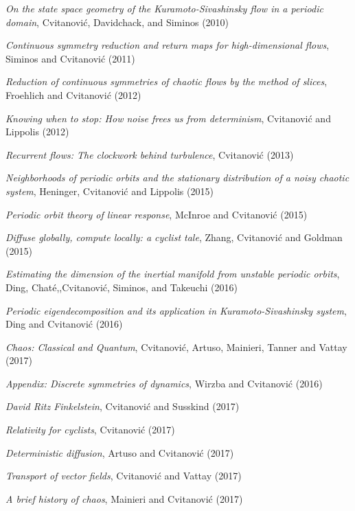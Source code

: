 {{
{\em On the state space geometry of the {Kuramoto-Sivashinsky} flow in a periodic domain},
{Cvitanovi{\'c}, Davidchack, and Siminos}
{(2010)}

{\em Continuous symmetry reduction and return maps for high-dimensional flows},
{Siminos and Cvitanovi{\'c}}
{(2011)}

{\em Reduction of continuous symmetries of chaotic flows by the method of
slices},
{Froehlich and Cvitanovi{\'c}}
{(2012)}

{\em Knowing when to stop: {How} noise frees us from determinism},
{Cvitanovi{\'c} and Lippolis}
{(2012)}

{\em Recurrent flows: {The} clockwork behind turbulence},
{Cvitanovi{\'c}}
{(2013)}

{\em Neighborhoods of periodic orbits and the stationary distribution of
a noisy chaotic system},
{Heninger, Cvitanovi{\'c} and Lippolis}
{(2015)}

{\em Periodic orbit theory of linear response},
{McInroe and Cvitanovi{\'c}}
{(2015)}

{\em Diffuse globally, compute locally: a cyclist tale},
{Zhang, Cvitanovi{\'c} and Goldman}
{(2015)}

{\em Estimating the dimension of the inertial manifold from unstable
periodic orbits},
{Ding, Chat\'e,,Cvitanovi\'c, Siminos, and Takeuchi}
{(2016)}

{\em Periodic eigendecomposition and its application in
{Kuramoto-Sivashinsky} system},
{Ding and Cvitanovi{\'c}}
{(2016)}

 {\em Chaos: {Classical and Quantum}},
{Cvitanovi{\'c}, Artuso, Mainieri, Tanner and Vattay}
{(2017)}

{\em Appendix: {Discrete} symmetries of dynamics},
{Wirzba and Cvitanovi{\'c}}
{(2016)}

{\em {David Ritz Finkelstein}},
{Cvitanovi{\'{c}} and Susskind}
{(2017)}

{\em Relativity for cyclists},
{Cvitanovi{\'c}}
{(2017)}

{\em Deterministic diffusion},
{Artuso and Cvitanovi{\'c}}
{(2017)}

{\em Transport of vector fields},
{Cvitanovi{\'c} and Vattay}
{(2017)}

{\em A brief history of chaos},
{Mainieri and Cvitanovi{\'c}}
{(2017)}

}}
